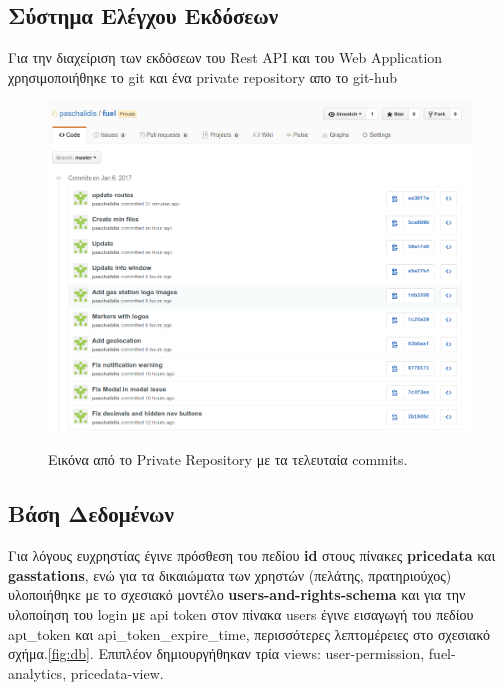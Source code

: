 \subsection{Σύστημα Ελέγχου Εκδόσεων}

Για την διαχείριση των εκδόσεων του Rest API και του Web Application χρησιμοποιήθηκε το git\footnotemark{} και ένα private repository απο το git-hub\footnotemark{}

\begin{figure}[H]
  \caption{Εικόνα από το Private Repository με τα τελευταία commits.}
  \centering
    \includegraphics[width=1\textwidth]{img/git.png}
    \label{fig:git}
\end{figure}

\subsection{Βάση Δεδομένων}
Για λόγους ευχρηστίας έγινε πρόσθεση του πεδίου \textbf{id} στους πίνακες \textbf{pricedata} και \textbf{gasstations}, ενώ για τα δικαιώματα των χρηστών (πελάτης, πρατηριούχος) υλοποιήθηκε με το σχεσιακό μοντέλο \textbf{users-and-rights-schema} και για την υλοποίηση του login με api token στον πίνακα users έγινε εισαγωγή του πεδίου apι\_token και api\_token\_expire\_time, περισσότερες λεπτομέρειες στο σχεσιακό σχήμα.\ref{fig:db}. Επιπλέον δημιουργήθηκαν τρία views: user-permission, fuel-analytics, pricedata-view.

